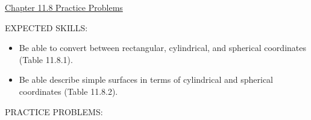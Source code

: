 \documentclass[12pt]{article}
\begin{document}
\begin{center}
\underline{\LARGE{Chapter 11.8 Practice Problems}}
\end{center}

\noindent EXPECTED SKILLS:

\begin{itemize}

\item Be able to convert between rectangular, cylindrical, and spherical coordinates (Table 11.8.1). 

\item Be able describe simple surfaces in terms of cylindrical and spherical coordinates (Table 11.8.2).

\end{itemize}

\noindent PRACTICE PROBLEMS:

\medskip
\end{document}
